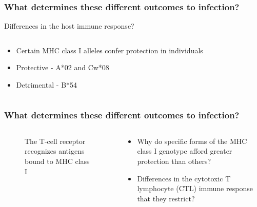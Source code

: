 \documentclass[slidescentered,compress]{beamer}
\begin{document}
\frame
{
\frametitle{What determines these different outcomes to infection?}

Differences in the host immune response?

\begin{columns}[c]

\begin{column}{5cm}
\begin{itemize}
\item Certain MHC class I alleles confer protection in individuals
\item Protective - A*02 and Cw*08
\item Detrimental - B*54
\end{itemize}
\end{column}


\begin{column}{5cm}
\begin{figure}
\end{figure}


\begin{figure}
\end{figure}
\end{column}
\end{columns}
}

\frame
{
\frametitle{What determines these different outcomes to infection?}

\begin{columns}[c]

\begin{column}{4cm}
\begin{figure}
	\caption{The T-cell receptor recognizes antigens bound to MHC class I}
\end{figure}
\end{column}

\pause

\begin{column}{6cm}
\begin{itemize}
\item Why do specific forms of the MHC class I genotype afford greater protection than others?
\item Differences in the cytotoxic T lymphocyte (CTL) immune response that they restrict?
\end{itemize}
\end{column}
\end{columns}

}
\end{document}
